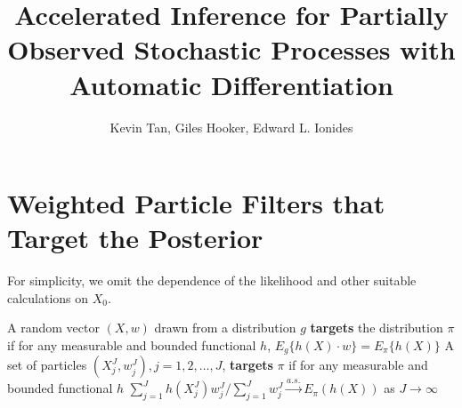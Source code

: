 \documentclass[9pt,twoside,lineno]{pnas-new-si}
\begin{document}
\title{Accelerated Inference for Partially Observed Stochastic Processes with Automatic Differentiation}
\author{Kevin Tan, Giles Hooker, Edward L. Ionides}






\maketitle

\SItext


\section{Weighted Particle Filters that Target the Posterior}

For simplicity, we omit the dependence of the likelihood and other suitable calculations on $X_0$.


\begin{defn}[Targeting]
    \label{defn:targeting}
    A random vector $(X, w)$ drawn from a distribution $g$ \textbf{targets} the distribution $\pi$ if for any measurable and bounded functional $h$, $E_g\{h(X) \cdot w\}=E_\pi\{h(X)\}$ 
    A set of particles $(X^J_j, w^J_j), j=1,2, \ldots,J$, \textbf{targets} $\pi$ if for any measurable and bounded functional $h$
    ${\sum_{j=1}^J h(X^J_j) w^J_j}/{\sum_{j=1}^J w^J_j} \stackrel{a.s.}{\to} E_\pi(h(X))$ as $J\to\infty$
\end{defn}
\end{document}
